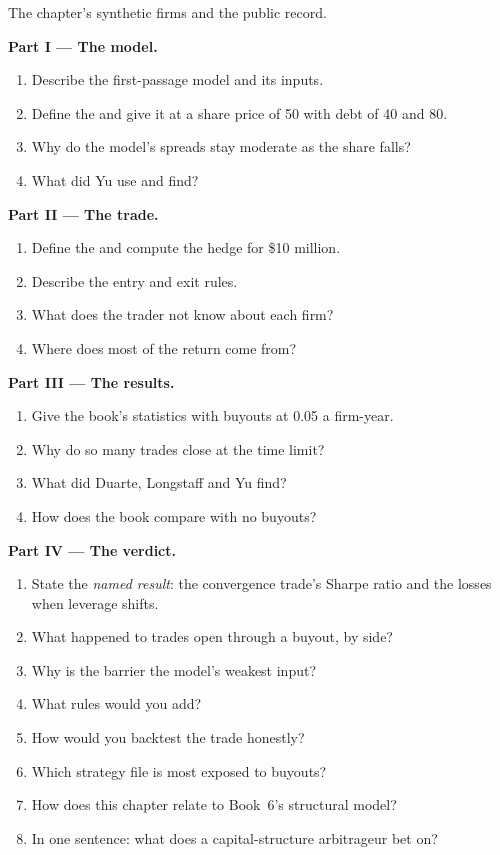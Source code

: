 \begin{problem}\label{pb:s2:capital-structure-arbitrage:1}
The chapter's synthetic firms and the public record.

\medskip\noindent\textbf{Part I --- The model.}
\begin{enumerate}
\item Describe the first-passage model and its inputs.
\item Define the  and give it at a share price of 50 with debt of 40 and 80.
\item Why do the model's spreads stay moderate as the share falls?
\item What did Yu use and find?
\end{enumerate}

\medskip\noindent\textbf{Part II --- The trade.}
\begin{enumerate}[resume]
\item Define the  and compute the hedge for \$10 million.
\item Describe the entry and exit rules.
\item What does the trader not know about each firm?
\item Where does most of the return come from?
\end{enumerate}

\medskip\noindent\textbf{Part III --- The results.}
\begin{enumerate}[resume]
\item Give the book's statistics with buyouts at 0.05 a firm-year.
\item Why do so many trades close at the time limit?
\item What did Duarte, Longstaff and Yu find?
\item How does the book compare with no buyouts?
\end{enumerate}

\medskip\noindent\textbf{Part IV --- The verdict.}
\begin{enumerate}[resume]
\item State the \emph{named result}: the convergence trade's Sharpe ratio and the losses when leverage shifts.
\item What happened to trades open through a buyout, by side?
\item Why is the barrier the model's weakest input?
\item What rules would you add?
\item How would you backtest the trade honestly?
\item Which strategy file is most exposed to buyouts?
\item How does this chapter relate to Book~6's structural model?
\item In one sentence: what does a capital-structure arbitrageur bet on?
\end{enumerate}
\end{problem}

